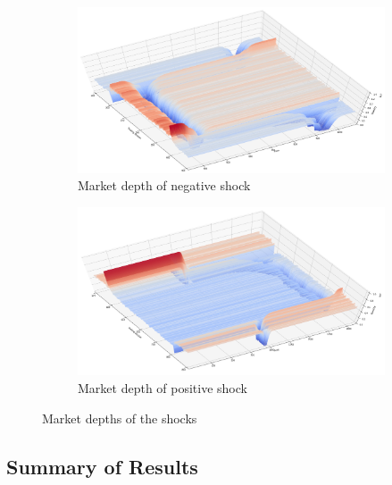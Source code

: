 
\begin{figure}[H]
    \centering
    \begin{subfigure}{.5\textwidth}
      \centering
      \includegraphics[width=\linewidth]{plots/shocks_neg_market_depth_in_equilibrium.png}
      \caption{Market depth of negative shock}
      \label{fig:market_depth_neg_shock}
    \end{subfigure}%
    \begin{subfigure}{.5\textwidth}
      \centering
      \includegraphics[width=\linewidth]{plots/shocks_pos_market_depth_in_equilibrium.png}
      \caption{Market depth of positive shock}
      \label{fig:market_depth_pos_shock}
    \end{subfigure}
    \caption{Market depths of the shocks}
    \label{fig:market_depths_shocks}
\end{figure}


\subsection{Summary of Results}

